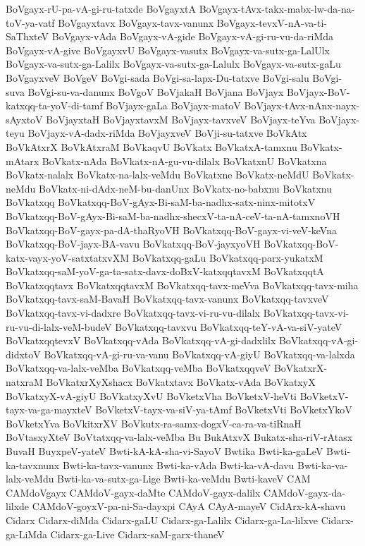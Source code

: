 {BoVgayx-rU-pa-vA-gi-ru-tatxde
BoVgayxtA
BoVgayx-tAvx-takx-mabx-lw-da-na-toV-ya-vatf
BoVgayxtavx
BoVgayx-tavx-vanunx
BoVgayx-tevxV-nA-va-ti-SaThxteV
BoVgayx-vAda
BoVgayx-vA-gide
BoVgayx-vA-gi-ru-vu-da-riMda
BoVgayx-vA-give
BoVgayxvU
BoVgayx-vasutx
BoVgayx-va-sutx-ga-LalUlx
BoVgayx-va-sutx-ga-Lalilx
BoVgayx-va-sutx-ga-Lalulx
BoVgayx-va-sutx-gaLu
BoVgayxveV
BoVgeV
BoVgi-sada
BoVgi-sa-lapx-Du-tatxve
BoVgi-salu
BoVgi-suva
BoVgi-su-va-danunx
BoVgoV
BoVjakaH
BoVjana
BoVjayx
BoVjayx-BoV-katxqq-ta-yoV-di-tamf
BoVjayx-gaLa
BoVjayx-matoV
BoVjayx-tAvx-nAnx-nayx-sAyxtoV
BoVjayxtaH
BoVjayxtavxM
BoVjayx-tavxveV
BoVjayx-teYva
BoVjayx-teyu
BoVjayx-vA-dadx-riMda
BoVjayxveV
BoVji-su-tatxve
BoVkAtx
BoVkAtxrX
BoVkAtxraM
BoVkaqvU
BoVkatx
BoVkatxA-tamxnu
BoVkatx-mAtarx
BoVkatx-nAda
BoVkatx-nA-gu-vu-dilalx
BoVkatxnU
BoVkatxna
BoVkatx-nalalx
BoVkatx-na-lalx-veMdu
BoVkatxne
BoVkatx-neMdU
BoVkatx-neMdu
BoVkatx-ni-dAdx-neM-bu-danUnx
BoVkatx-no-babxnu
BoVkatxnu
BoVkatxqq
BoVkatxqq-BoV-gAyx-Bi-saM-ba-nadhx-satx-ninx-mitotxV
BoVkatxqq-BoV-gAyx-Bi-saM-ba-nadhx-shecxV-ta-nA-ceV-ta-nA-tamxnoVH
BoVkatxqq-BoV-gayx-pa-dA-thaRyoVH
BoVkatxqq-BoV-gayx-vi-veV-keVna
BoVkatxqq-BoV-jayx-BA-vavu
BoVkatxqq-BoV-jayxyoVH
BoVkatxqq-BoV-katx-vayx-yoV-satxtatxvXM
BoVkatxqq-gaLu
BoVkatxqq-parx-yukatxM
BoVkatxqq-saM-yoV-ga-ta-satx-davx-doBxV-katxqqtavxM
BoVkatxqqtA
BoVkatxqqtavx
BoVkatxqqtavxM
BoVkatxqq-tavx-meVva
BoVkatxqq-tavx-miha
BoVkatxqq-tavx-saM-BavaH
BoVkatxqq-tavx-vanunx
BoVkatxqq-tavxveV
BoVkatxqq-tavx-vi-dadxre
BoVkatxqq-tavx-vi-ru-vu-dilalx
BoVkatxqq-tavx-vi-ru-vu-di-lalx-veM-budeV
BoVkatxqq-tavxvu
BoVkatxqq-teY-vA-va-siV-yateV
BoVkatxqqtevxV
BoVkatxqq-vAda
BoVkatxqq-vA-gi-dadxlilx
BoVkatxqq-vA-gi-didxtoV
BoVkatxqq-vA-gi-ru-va-vanu
BoVkatxqq-vA-giyU
BoVkatxqq-va-lalxda
BoVkatxqq-va-lalx-veMba
BoVkatxqq-veMba
BoVkatxqqveV
BoVkatxrX-natxraM
BoVkatxrXyXshacx
BoVkatxtavx
BoVkatx-vAda
BoVkatxyX
BoVkatxyX-vA-giyU
BoVkatxyXvU
BoVketxVha
BoVketxV-heVti
BoVketxV-tayx-va-ga-mayxteV
BoVketxV-tayx-va-siV-ya-tAmf
BoVketxVti
BoVketxYkoV
BoVketxYva
BoVkitxrXV
BoVkutx-ra-samx-dogxV-ca-ra-va-tiRnaH
BoVtasxyXteV
BoVtatxqq-va-lalx-veMba
Bu
BukAtxvX
Bukatx-sha-riV-rAtasx
BuvaH
BuyxpeV-yateV
Bwti-kA-kA-sha-vi-SayoV
Bwtika
Bwti-ka-gaLeV
Bwti-ka-tavxnunx
Bwti-ka-tavx-vanunx
Bwti-ka-vAda
Bwti-ka-vA-davu
Bwti-ka-va-lalx-veMdu
Bwti-ka-va-sutx-ga-Lige
Bwti-ka-veMdu
Bwti-kaveV
CAM
CAMdoVgayx
CAMdoV-gayx-daMte
CAMdoV-gayx-dalilx
CAMdoV-gayx-da-lilxde
CAMdoV-goyxV-pa-ni-Sa-dayxpi
CAyA
CAyA-mayeV
CidArx-kA-shavu
Cidarx
Cidarx-diMda
Cidarx-gaLU
Cidarx-ga-Lalilx
Cidarx-ga-La-lilxve
Cidarx-ga-LiMda
Cidarx-ga-Live
Cidarx-saM-garx-thaneV
}
